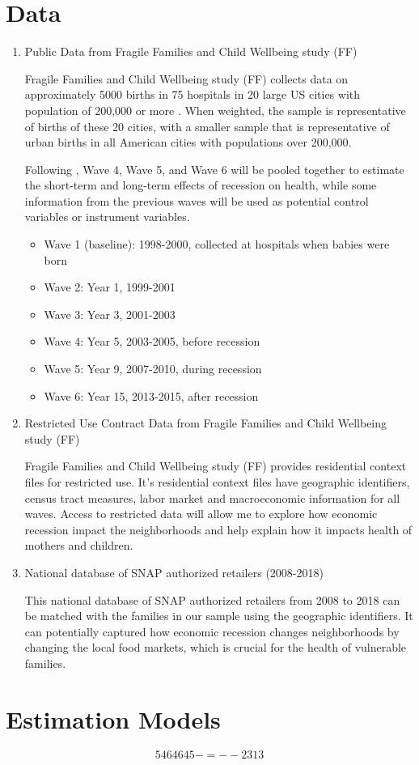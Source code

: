 \documentclass[12pt]{article}
\begin{document}
\section{Data}
\label{sec:data}

\begin{enumerate}
	\item Public Data from Fragile Families and Child Wellbeing study (FF) 

	Fragile Families and Child Wellbeing study (FF) collects data on approximately 5000 births in 75 hospitals in 20 large US cities with population of 200,000 or more \citet{reichman2001fragile}. When weighted, the sample is representative of births of these 20 cities, with a smaller sample that is representative of urban births in all American cities with populations over 200,000.

	Following \citet{currie2015great}, Wave 4, Wave 5, and Wave 6 will be pooled together to estimate the short-term and long-term effects of recession on health, while some information from the previous waves will be used as potential control variables or instrument variables.
	
	\begin{itemize}
	    \item Wave 1 (baseline): 1998-2000, collected at hospitals when babies were born
	    \item Wave 2: Year 1, 1999-2001
	    \item Wave 3: Year 3, 2001-2003
	    \item Wave 4: Year 5, 2003-2005, before recession
	    \item Wave 5: Year 9, 2007-2010, during recession
	    \item Wave 6: Year 15, 2013-2015, after recession
	\end{itemize}

	\item Restricted Use Contract Data from Fragile Families and Child Wellbeing study (FF) 

	Fragile Families and Child Wellbeing study (FF) provides residential context files for restricted use. It's residential context files have geographic identifiers, census tract measures, labor market and macroeconomic information for all waves. Access to restricted data will allow me to explore how economic recession impact the neighborhoods and help explain how it impacts health of mothers and children.

	\item National database of SNAP authorized retailers (2008-2018)

	This national database of SNAP authorized retailers from 2008 to 2018 can be matched with the families in our sample using the geographic identifiers. It can potentially captured how economic recession changes neighborhoods by changing the local food markets, which is crucial for the health of vulnerable families.
\end{enumerate}


\section{Estimation Models}
\label{sec:models}

\begin{equation}
    5464645-=--2313
\end{equation}


\setlength\bibsep{0pt}


\end{document}
